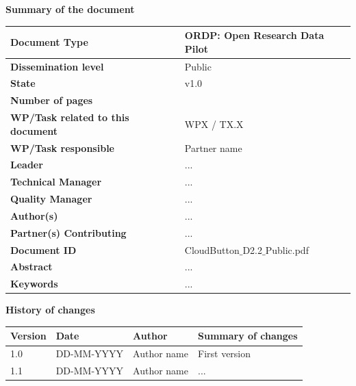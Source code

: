 \documentclass[a4paper,11pt]{article}
\numberwithin{table}{subsection} %
\begin{document}
{
\def\arraystretch{1.5} %

{\LARGE \textbf{Summary of the document}}

\begin{center}
    \begin{tabular}{ | l | p{10cm} |}
    \hline
    \cellcolor{gray!25} \textbf{Document Type} & ORDP: Open Research Data Pilot \\ \hline
    \cellcolor{gray!25} \textbf{Dissemination level} & Public \\ \hline
    \cellcolor{gray!25} \textbf{State} & v1.0 \\ \hline
    \cellcolor{gray!25} \textbf{Number of pages} & \pageref{LastPage} \\ \hline
    \cellcolor{gray!25} \textbf{WP/Task related to this document} & WPX / TX.X \\ \hline
    \cellcolor{gray!25} \textbf{WP/Task responsible} & Partner name  \\ \hline
    \cellcolor{gray!25} \textbf{Leader} & ... \\ \hline
    \cellcolor{gray!25} \textbf{Technical Manager} & ... \\ \hline
    \cellcolor{gray!25} \textbf{Quality Manager} & ... \\ \hline
    \cellcolor{gray!25} \textbf{Author(s)} & ... \\ \hline
    \cellcolor{gray!25} \textbf{Partner(s) Contributing} & ... \\ \hline
    \cellcolor{gray!25} \textbf{Document ID} & CloudButton$\_$D2.2$\_$Public.pdf \\ \hline
    \cellcolor{gray!25} \textbf{Abstract} & ... \\ \hline
    \cellcolor{gray!25} \textbf{Keywords} & ... \\ \hline
    \end{tabular}
\end{center}
}


\newpage\pagestyle{empty}

{
\def\arraystretch{1.5} %

{\LARGE \textbf{History of changes}}

\begin{center}
    \begin{tabular}{ | l | l | p{3cm} | p{9cm} | }
    \hline
    \rowcolor[gray]{0.8}
    \textbf{Version} &
    \textbf{Date} &
    \textbf{Author} &
    \textbf{Summary of changes} \\ \hline

    1.0 & DD-MM-YYYY & Author name & First version \\ \hline
    1.1 & DD-MM-YYYY & Author name & ... \\ \hline
    \end{tabular}
\end{center}
}
\end{document}
